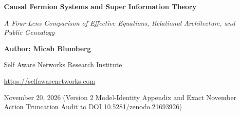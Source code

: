 \documentclass[
  american,
  11pt,
  letterpaper,
]{article}
\author{}
\date{}
\begin{document}
\begin{center}

{\LARGE\bfseries Causal Fermion Systems and Super Information Theory\par}

\vspace{0.35em}

{\large\itshape A Four-Lens Comparison of Effective Equations, Relational Architecture, and Public Genealogy\par}

\vspace{0.8em}

{\small\textbf{Author: Micah Blumberg}\par}

{\small Self Aware Networks Research Institute\par}

{\small\url{https://selfawarenetworks.com}\par}

{\small November 20, 2026 (Version 2 Model-Identity Appendix and Exact November Action Truncation Audit to DOI 10.5281/zenodo.21693926)\par}

\end{center}

\vspace{0.65em}
\end{document}
